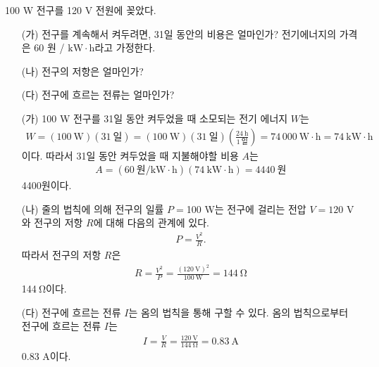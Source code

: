 \documentclass[tightenlines,floatfix,nofootinbib,superscriptaddress,fleqn]{revtex4-2}
\begin{document}
\vspace{1.cm}

 100 W 전구를 120 V 전원에 꽂았다.
\begin{itemize}
\item[(가)] 전구를 계속해서 켜두려면, 31일 동안의 비용은 얼마인가?
  전기에너지의 가격은 60 원 / $\mathrm{kW\cdot h}$라고 가정한다.
\item[(나)] 전구의 저항은 얼마인가?
\item[(다)] 전구에 흐르는 전류는 얼마인가? 
\end{itemize}
\begin{itemize}
  \item[(가)] 100 W 전구를 31일 동안 켜두었을 때 소모되는 전기 에너지 $W$는
  \begin{align}
    W = (100~\mathrm{W})(31~\text{일}) = (100~\mathrm{W})(31~\text{일})
    \left(\frac{24~\text{h}}{1~\text{일}}\right)
    =74\,000~\mathrm{W\cdot h}=74~\mathrm{kW\cdot h}
  \end{align}
 이다. 따라서 31일 동안 켜두었을 때 지불해야할 비용 $A$는
 \begin{align}
  A = (60~\text{원}/\mathrm{kW\cdot h})(74~\mathrm{kW\cdot h})
  =4440~\text{원}
 \end{align}
 4400원이다.
  \item[(나)] 줄의 법칙에 의해 전구의 일률 $P = $100 W는 전구에 걸리는 전압 $V=120$ V와
  전구의 저항 $R$에 대해 다음의 관계에 있다.
  \begin{align}
    P = \frac{V^2}{R}.
  \end{align}
  따라서 전구의 저항 $R$은
  \begin{align}
    R = \frac{V^2}{P} = \frac{(120~\mathrm{V})^2}{100~\mathrm{W}}
    =144~\mathrm{\Omega}
  \end{align}
  144$~\mathrm{\Omega}$이다.
  \item[(다)] 전구에 흐르는 전류 $I$는 옴의 법칙을 통해 구할 수 있다. 옴의 법칙으로부터
  전구에 흐르는 전류 $I$는
  \begin{align}
    I=\frac{V}{R} = \frac{120~\mathrm{V}}{144~\mathrm{\Omega}}
    =0.83~\mathrm{A}
  \end{align}
  0.83 A이다.
  
\end{itemize}


\newpage
\end{document}
